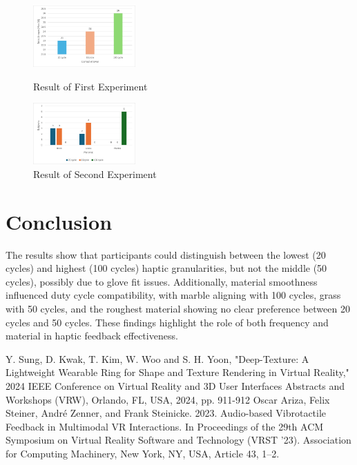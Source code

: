 \documentclass[a4paper,twocolumn]{article}
\begin{document}
\begin{figure}[h]
  \centering
  \includegraphics[width=0.35\textwidth]{./Fig/Blind_Test_graph.png}
  \caption{{Result of First Experiment}}
  \label{fig1}
  \vspace{0.1cm}
  \centering
  \includegraphics[width=0.35\textwidth]{./Fig/Select_Cycle_graph.png}
  \caption{{Result of Second Experiment}}
  \label{fig2}
\end{figure}


\section{Conclusion}
The results show that participants could distinguish between the lowest (20 cycles) and highest (100 cycles) haptic granularities, but not the middle (50 cycles), possibly due to glove fit issues. Additionally, material smoothness influenced duty cycle compatibility, with marble aligning with 100 cycles, grass with 50 cycles, and the roughest material showing no clear preference between 20 cycles and 50 cycles. These findings highlight the role of both frequency and material in haptic feedback effectiveness.
\begin{thebibliography}{99}
\scriptsize
     Y. Sung, D. Kwak, T. Kim, W. Woo and S. H. Yoon, "Deep-Texture: A Lightweight Wearable Ring for Shape and Texture Rendering in Virtual Reality," 2024 IEEE Conference on Virtual Reality and 3D User Interfaces Abstracts and Workshops (VRW), Orlando, FL, USA, 2024, pp. 911-912
     Oscar Ariza, Felix Steiner, André Zenner, and Frank Steinicke. 2023. Audio-based Vibrotactile Feedback in Multimodal VR Interactions. In Proceedings of the 29th ACM Symposium on Virtual Reality Software and Technology (VRST '23). Association for Computing Machinery, New York, NY, USA, Article 43, 1–2.
\end{thebibliography}
\end{document}
